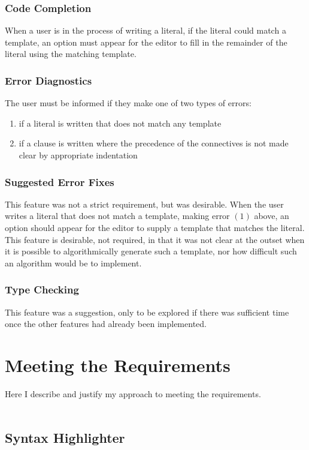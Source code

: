 \documentclass[../main.tex]{subfiles}
\begin{document}
\subsubsection{Code Completion}
When a user is in the process of writing a literal, if the literal could match a template, an option must appear for the editor to fill in the remainder of the literal using the matching template.

\subsubsection{Error Diagnostics}
The user must be informed if they make one of two types of errors:
\begin{enumerate}
    \item if a literal is written that does not match any template 
    \item if a clause is written where the precedence of the connectives is not made clear by appropriate indentation
\end{enumerate}

\subsubsection{Suggested Error Fixes}
This feature was not a strict requirement, but was desirable. When the user writes a literal that does not match a template, making error $(1)$ above, an option should appear for the editor to supply a template that matches the literal. This feature is desirable, not required, in that it was not clear at the outset when it is possible to algorithmically generate such a template, nor how difficult such an algorithm would be to implement.

\subsubsection{Type Checking}
This feature was a suggestion, only to be explored if there was sufficient time once the other features had already been implemented. 


\section{Meeting the Requirements}
Here I describe and justify my approach to meeting the requirements.
\\
\\
\subsection{Syntax Highlighter}
\end{document}
